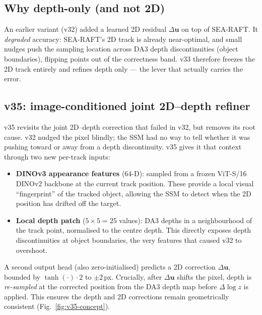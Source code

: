 \documentclass[11pt,a4paper]{article}
\begin{document}
\subsection{Why depth-only (and not 2D)}
An earlier variant (v32) added a learned 2D residual $\Delta\mathbf{u}$ on top of SEA-RAFT. It
\emph{degraded} accuracy: SEA-RAFT's 2D track is already near-optimal, and small nudges push the
sampling location across DA3 depth discontinuities (object boundaries), flipping points out of the
correctness band. v33 therefore freezes the 2D track entirely and refines depth only --- the lever
that actually carries the error.

\subsection{v35: image-conditioned joint 2D--depth refiner}
\label{sec:v35}

v35 revisits the joint 2D--depth correction that failed in v32, but removes its root cause.
v32 nudged the pixel blindly; the SSM had no way to tell whether it was pushing toward or
away from a depth discontinuity.
v35 gives it that context through two new per-track inputs:

\begin{itemize}
\item \textbf{DINOv3 appearance features} (64-D): sampled from a frozen ViT-S/16 DINOv2
  backbone at the current track position.  These provide a local visual ``fingerprint'' of the
  tracked object, allowing the SSM to detect when the 2D position has drifted off the target.
\item \textbf{Local depth patch} ($5{\times}5 = 25$ values): DA3 depths in a neighbourhood of
  the track point, normalised to the centre depth.  This directly exposes depth discontinuities
  at object boundaries, the very features that caused v32 to overshoot.
\end{itemize}

A second output head (also zero-initialised) predicts a 2D correction $\Delta\mathbf{u}$, bounded
by $\tanh(\cdot)\!\cdot\!2$ to $\pm 2$\,px.  Crucially, after $\Delta\mathbf{u}$ shifts the pixel,
depth is \emph{re-sampled} at the corrected position from the DA3 depth map before
$\Delta\!\log z$ is applied.  This ensures the depth and 2D corrections remain geometrically
consistent (Fig.~\ref{fig:v35-concept}).
\end{document}
